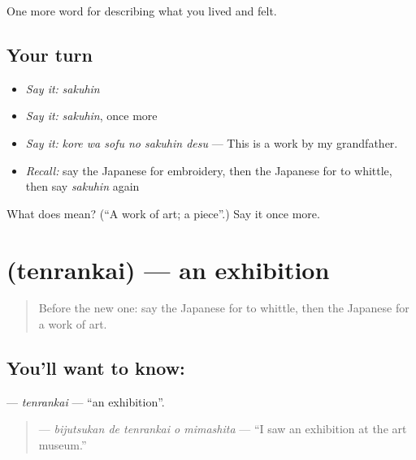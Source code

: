 \begin{grammarlens}[title={What you've built}]
One more word for describing what you lived and felt.
\end{grammarlens}

\subsection*{Your turn}
\begin{itemize}
\raggedright
  \item \emph{Say it:} \emph{sakuhin}
  \item \emph{Say it:} \emph{sakuhin}, once more
  \item \emph{Say it:} \emph{kore wa sofu no sakuhin desu} — This is a work by my grandfather.
  \item \emph{Recall:} say the Japanese for embroidery, then the Japanese for to whittle, then say \emph{sakuhin} again
\end{itemize}

\begin{tcolorbox}[breakable,colback=teal!4,colframe=teal!35!black,title={Before you move on}]
What does  mean? (\textquotedblleft{}A work of art; a piece\textquotedblright{}.) Say it once more.
\end{tcolorbox}
\section[\texorpdfstring{\ja{てんらんかい} (tenrankai)}{てんらんかい (tenrankai)}]{ (tenrankai) — an exhibition}

\label{lesson:JA-C468-tenrankai}



\begin{quote}
Before the new one: say the Japanese for to whittle, then the Japanese for a work of art.
\end{quote}

\subsection*{You'll want to know: }
\textbf{} — \emph{tenrankai} — \textquotedblleft{}an exhibition\textquotedblright{}.

\begin{quote}
\textbf{  } — \emph{bijutsukan de tenrankai o mimashita} — \textquotedblleft{}I saw an exhibition at the art museum.\textquotedblright{}
\end{quote}

